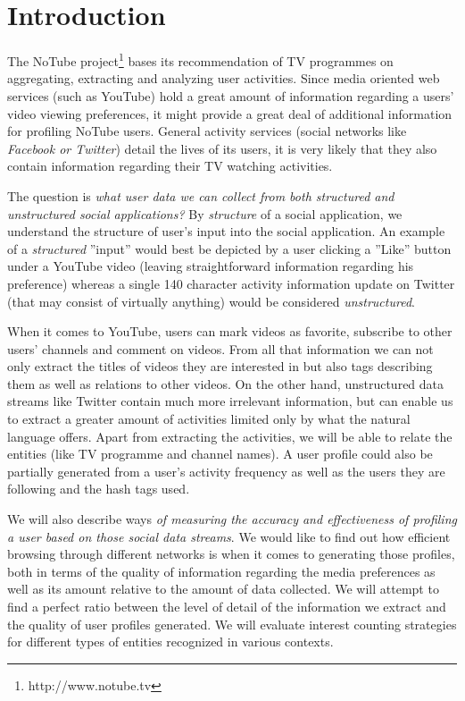 \section{Introduction}

The NoTube project\footnote[1]{http://www.notube.tv} bases its recommendation of TV programmes on aggregating, extracting and analyzing user activities. Since media oriented web services (such as YouTube) hold a great amount of information regarding a users' video viewing preferences, it might provide a great deal of additional information for profiling NoTube users. General activity services (social networks like \textit{Facebook or Twitter}) detail the lives of its users, it is very likely that they also contain information regarding their TV watching activities.

The question is \textit{what user data we can collect from both structured and unstructured social applications?} By \textit{structure} of a social application, we understand the structure of user's input into the social application. An example of a \textit{structured} ''input'' would best be depicted by a user clicking a ''Like'' button under a YouTube video (leaving straightforward information regarding his preference)
whereas a single 140 character activity information update on Twitter (that may consist of virtually anything) would be considered \textit{unstructured}.

When it comes to YouTube, users can mark videos as favorite, subscribe to other users' channels and comment on videos. From all that information we can not only extract the titles of videos they are interested in but also tags describing them as well as relations to other videos. On the other hand, unstructured data streams like Twitter contain much more irrelevant information, but can enable us to extract a greater amount of activities limited only by what the natural language offers. Apart from extracting the activities, we will be able to relate the entities (like TV programme and channel names). A user profile could also be partially generated from a user's activity frequency as well as the users they are following and the hash tags used.

We will also describe ways \textit{of measuring the accuracy and effectiveness of profiling a user based on those social data streams}. We would like to find out how efficient browsing through different networks is when it comes to generating those profiles, both in terms of the quality of information regarding the media preferences as well as its amount relative to the amount of data collected. We will attempt to find a perfect ratio between the level of detail of the information we extract and the quality of user profiles generated. We will evaluate interest counting strategies for different types of entities recognized in various contexts.

